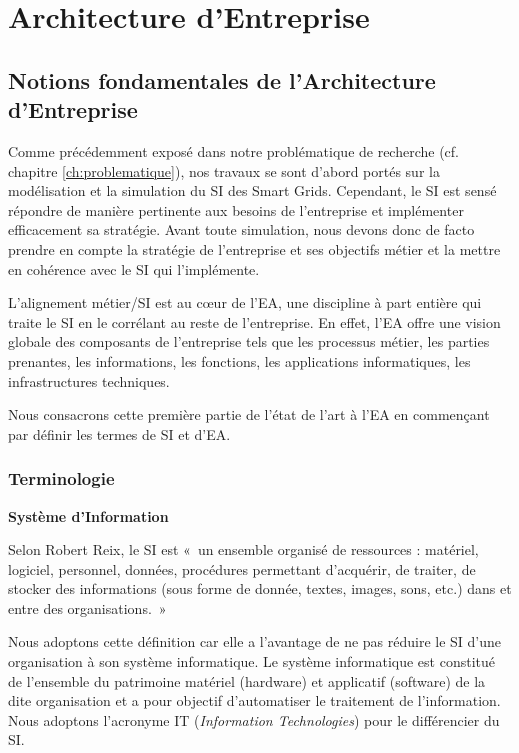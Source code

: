 \chapter{Architecture d'Entreprise}
\label{ch:EA}

\section{Notions fondamentales de l'Architecture d'Entreprise}

Comme précédemment exposé dans notre problématique de recherche (cf. chapitre \ref{ch:problematique}), nos travaux se sont d'abord portés sur la modélisation et la simulation du SI des Smart Grids. Cependant, le SI est sensé répondre de manière pertinente aux besoins de l'entreprise et implémenter efficacement sa stratégie. Avant toute simulation, nous devons donc de facto prendre en compte la stratégie de l'entreprise et ses objectifs métier et la mettre en cohérence avec le SI qui l'implémente.

L'alignement métier/SI est au cœur de l'EA, une discipline à part entière qui traite le SI en le corrélant au reste de l'entreprise. En effet, l'EA offre une vision globale des composants de l'entreprise tels que les processus métier, les parties prenantes, les informations, les fonctions, les applications informatiques, les infrastructures techniques. 

Nous consacrons cette première partie de l'état de l'art à l'EA en commençant par définir les termes de SI et d'EA. 
  
	\subsection{Terminologie}
	
\textbf{Système d'Information}


Selon Robert Reix, le SI est «~un ensemble organisé de ressources : matériel, 
logiciel, personnel, données, procédures permettant d'acquérir, de traiter, de 
stocker des informations (sous forme de donnée, textes, images, sons, etc.) dans 
et entre des organisations.~»

Nous adoptons cette définition car elle a l'avantage de ne pas réduire le SI 
d'une organisation à son système informatique. Le système informatique est constitué de 
l'ensemble du patrimoine matériel (hardware) et applicatif (software) de la dite 
organisation et a pour objectif d'automatiser le traitement de l'information. 
Nous adoptons l'acronyme IT (\textit{Information Technologies}) pour le différencier du SI.

